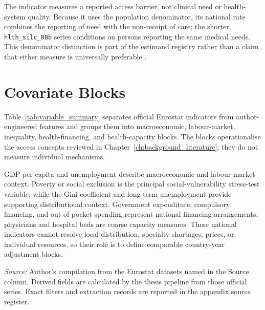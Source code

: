 The indicator measures a reported access barrier, not clinical need or health-system quality. Because it uses the population denominator, its national rate combines the reporting of need with the non-receipt of care; the shorter \texttt{hlth\_silc\_08b} series conditions on persons reporting the same medical needs. This denominator distinction is part of the estimand registry rather than a claim that either measure is universally preferable \citep{guidi_ingleby_2023_valid_data,ingleby_guidi_2025_unmet_needs_methodology}.

\section{Covariate Blocks}

Table~\ref{tab:variable_summary} separates official Eurostat indicators from author-engineered features and groups them into macroeconomic, labour-market, inequality, health-financing, and health-capacity blocks. The blocks operationalise the access concepts reviewed in Chapter~\ref{ch:background_literature}; they do not measure individual mechanisms.

GDP per capita and unemployment describe macroeconomic and labour-market context. Poverty or social exclusion is the principal social-vulnerability stress-test variable, while the Gini coefficient and long-term unemployment provide supporting distributional context. Government expenditure, compulsory financing, and out-of-pocket spending represent national financing arrangements; physicians and hospital beds are coarse capacity measures. These national indicators cannot resolve local distribution, specialty shortages, prices, or individual resources, so their role is to define comparable country-year adjustment blocks.

\begin{table}[H]
\centering
\scriptsize
\caption{Official Eurostat variables and author-engineered features used in the country-year panel. Coverage varies by dataset and year.}
\label{tab:variable_summary}

\vspace{0.25em}

\begin{minipage}{0.96\textwidth}
\scriptsize \textit{Source:} Author's compilation from the Eurostat datasets named in the Source column. Derived fields are calculated by the thesis pipeline from those official series. Exact filters and extraction records are reported in the appendix source register.
\end{minipage}
\end{table}

